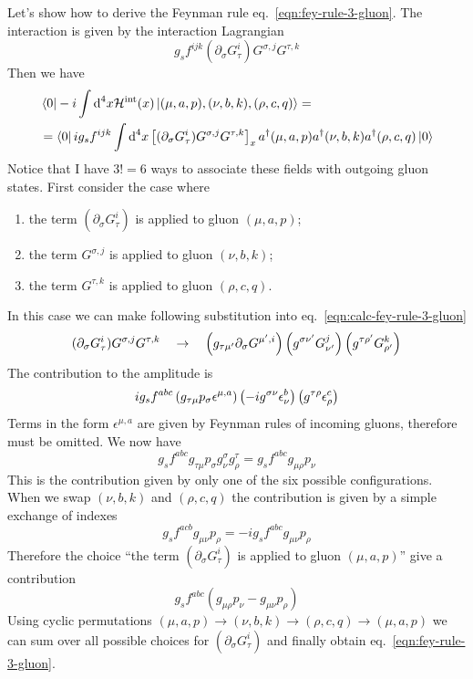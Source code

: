 \documentclass[TheoreticalPhy_ModB.tex]{subfiles}
\begin{document}
\begin{exercise}
Let's show how to derive the Feynman rule eq.~\eqref{eqn:fey-rule-3-gluon}. The interaction is given by the interaction Lagrangian
\[g_sf^{ijk}(\partial_\sigma G_{\tau}^i) G^{\sigma,j} G^{\tau,k}\]
Then we have
\begin{equation}\label{eqn:calc-fey-rule-3-gluon}\begin{split}
&\bra0-i\int\textup{d}^4x\mathcal H^{\text{int}}(x)\ket{(\mu,a,p),(\nu,b,k),(\rho,c,q)}=\\
&=\bra0ig_sf^{ijk}\int\textup{d}^4x\left[(\partial_\sigma G_{\tau}^i) G^{\sigma,j} G^{\tau,k}\right]_x a^\dagger(\mu,a,p)a^\dagger(\nu,b,k)a^\dagger(\rho,c,q)\ket0
\end{split}\end{equation}
Notice that I have $3!=6$ ways to associate these fields with outgoing gluon states. First consider the case where
\begin{enumerate}
\item the term $(\partial_\sigma G_\tau^i)$ is applied to gluon $(\mu,a,p)$;
\item the term $G^{\sigma,j}$ is applied to gluon $(\nu,b,k)$;
\item the term $G^{\tau, k}$ is applied to gluon $(\rho,c,q)$.
\end{enumerate}
In this case we can make following substitution into eq.~\eqref{eqn:calc-fey-rule-3-gluon}
\[(\partial_\sigma G_{\tau}^i) G^{\sigma,j} G^{\tau,k}
\quad\to\quad
\left(g_{\tau\mu'}\partial_\sigma  G^{\mu',i} \right)\left(g^{\sigma\nu'}G^{j}_{\nu'}\right)\left( g^{\tau\rho'}G^{k}_{\rho'}\right)\]
The contribution to the amplitude is 
\[ig_sf^{abc}\p{g_{\tau\mu}p_\sigma  \epsilon^{\mu,a} }\p{-ig^{\sigma\nu}\epsilon^{b}_{\nu}}\p{ g^{\tau\rho}\epsilon^{c}_{\rho}}
\]
Terms in the form $ \epsilon^{\mu,a}$ are given by Feynman rules of incoming gluons, therefore must be omitted. We now have
\[g_sf^{abc}g_{\tau\mu}p_\sigma g^{\sigma}_\nu g^{\tau}_\rho
=g_sf^{abc}g_{\mu\rho}p_\nu
\]
This is the contribution given by only one of the six possible configurations. When we swap $(\nu,b,k)$ and $(\rho,c,q)$ the contribution is given by a simple exchange of indexes
\[g_sf^{acb}g_{\mu\nu}p_\rho=-ig_sf^{abc}g_{\mu\nu}p_\rho\]
Therefore the choice ``the term $(\partial_\sigma G_\tau^i)$ is applied to gluon $(\mu,a,p)$'' give a contribution
\[g_sf^{abc}(g_{\mu\rho}p_\nu-g_{\mu\nu}p_\rho)\]
Using cyclic permutations  $(\mu,a,p)\to(\nu,b,k)\to(\rho,c,q)\to(\mu,a,p)$ we can sum over all possible choices for $(\partial_\sigma G_\tau^i)$ and finally obtain eq.~\eqref{eqn:fey-rule-3-gluon}.
\end{exercise}
\end{document}

